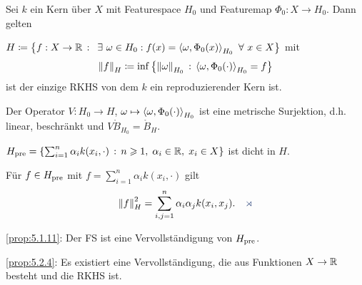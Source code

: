 \begin{prop}
\label{prop:5.2.4}
Sei $k$ ein Kern über $X$ mit Featurespace $H_0$ und Featuremap $\Phi_0:X\to
H_0$. Dann gelten
\begin{propenum}
\item\label{prop:5.2.4:1} $H\defl\setdef{f: X\to\R}{\exists \omega\in H_0 : f(x) =
\lin{\omega,\Phi_0(x)}_{H_0} \forall x\in X}$ mit
\begin{align*}
\left\|f\right\|_H \coloneq \inf\left\{ \left\|\omega\right\|_{H_0}\,:\,\left\langle\omega,\Phi_0(\cdot)\right\rangle_{H_0}
= f\right\}
\end{align*}
ist der einzige RKHS von dem $k$ ein reproduzierender Kern ist.
\item\label{prop:5.2.4:2} Der Operator $V: H_0\to H$, $\omega\mapsto
\left\langle\omega,\Phi_0(\cdot)\right\rangle_{H_0}$ ist eine metrische Surjektion, d.h. linear,
beschränkt und $V\ocirc{B}_{H_0} = \ocirc{B}_H$.
\item\label{prop:5.2.4:3} $H_{\mathrm{pre}} = \left\{ \sum_{i=1}^n \alpha_i
k(x_i,\cdot)\,:\,n\geqslant 1,\; \alpha_i\in \mathbb{R},\; x_i\in X\right\}$ ist dicht in $H$.
\item\label{prop:5.2.4:4} Für $f\in H_{\mathrm{pre}}$ mit $f=\sum_{i=1}^n \alpha_i
k(x_i,\cdot)$ gilt
\begin{align*}
\norm{f}_H^2 = \sum_{i,j=1}^n \alpha_i\alpha_j k(x_i,x_j).\fishhere 
\end{align*}
\end{propenum}
\end{prop}

\begin{bem*}[Verleich.]
\ref{prop:5.1.11}: Der FS ist eine Vervollständigung von $H_{\mathrm{pre}}$.

\ref{prop:5.2.4}: Es existiert eine Vervollständigung, die aus Funktionen $X\to
\mathbb{R}$ besteht und die RKHS ist.\maphere
\end{bem*}

